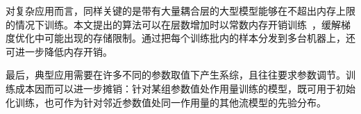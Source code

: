 对复杂应用而言，同样关键的是带有大量耦合层的大型模型能够在不超出内存上限的情况下训练。本文提出的算法可以在层数增加时以常数内存开销训练~\cite{Grathwohl2018}，缓解梯度优化中可能出现的存储限制。通过把每个训练批内的样本分发到多台机器上，还可进一步降低内存开销。


最后，典型应用需要在许多不同的参数取值下产生系综，且往往要求参数调节。训练成本因而可以进一步摊销：针对某组参数值处作用量训练的模型，既可用于初始化训练，也可作为针对邻近参数值处同一作用量的其他流模型的先验分布。
